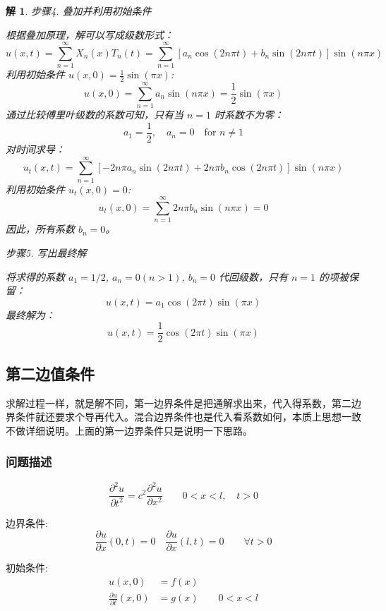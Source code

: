 \documentclass[a4paper, 12pt, oneside]{article} %
\numberwithin{subsection}{section}
\numberwithin{subsubsection}{subsection}
\theoremstyle{plain}
\newtheorem{solution}{解}[subsection]
\theoremstyle{definition}
\theoremstyle{remark}
\begin{document}
\begin{solution}
			步骤4. 叠加并利用初始条件
			
			\noindent
			根据叠加原理，解可以写成级数形式：
			\[
			u(x,t) = \sum_{n=1}^\infty X_n(x)T_n(t) = \sum_{n=1}^\infty [a_n \cos(2n\pi t) + b_n \sin(2n\pi t)] \sin(n\pi x)
			\]
			利用初始条件 $u(x,0) = \frac{1}{2}\sin(\pi x)$:
			\[
			u(x,0) = \sum_{n=1}^\infty a_n \sin(n\pi x) = \frac{1}{2}\sin(\pi x)
			\]
			通过比较傅里叶级数的系数可知，只有当 $n=1$ 时系数不为零：
			\[
			a_1 = \frac{1}{2}, \quad a_n = 0 \quad \text{for } n \neq 1
			\]
			对时间求导：
			\[
			u_t(x,t) = \sum_{n=1}^\infty [-2n\pi a_n \sin(2n\pi t) + 2n\pi b_n \cos(2n\pi t)] \sin(n\pi x)
			\]
			利用初始条件 $u_t(x,0) = 0$:
			\[
			u_t(x,0) = \sum_{n=1}^\infty 2n\pi b_n \sin(n\pi x) = 0
			\]
			因此，所有系数 $b_n=0$。
			
			步骤5. 写出最终解
			
			\noindent
			将求得的系数 $a_1=1/2$, $a_n=0 (n>1)$, $b_n=0$ 代回级数，只有 $n=1$ 的项被保留：
			\[
			u(x,t) = a_1 \cos(2\pi t) \sin(\pi x)
			\]
			最终解为：
			\[
			u(x,t) = \frac{1}{2}\cos(2\pi t)\sin(\pi x)
			\]
		\end{solution}
		
		
		\subsection{第二边值条件}
		求解过程一样，就是解不同，第一边界条件是把通解求出来，代入得系数，第二边界条件就还要求个导再代入。混合边界条件也是代入看系数如何，本质上思想一致不做详细说明。上面的第一边界条件只是说明一下思路。
		\subsubsection{问题描述}
		\begin{equation} \label{eq:wave_equation_neumann}
			\frac{\partial^2 u}{\partial t^2} = c^2 \frac{\partial^2 u}{\partial x^2} \qquad 0 < x < l, \quad t > 0
		\end{equation}
		
		边界条件:
		\begin{equation} \label{eq:boundary_conditions_neumann}
			\frac{\partial u}{\partial x}(0, t) = 0 \quad \frac{\partial u}{\partial x}(l, t) = 0 \qquad \forall t > 0
		\end{equation}
		
		初始条件:
		\begin{equation} \label{eq:initial_conditions_neumann}
			\begin{aligned}
				u(x, 0) &= f(x) \\
				\frac{\partial u}{\partial t}(x, 0) &= g(x) \qquad 0 < x < l
			\end{aligned}
		\end{equation}
		
\end{document}
